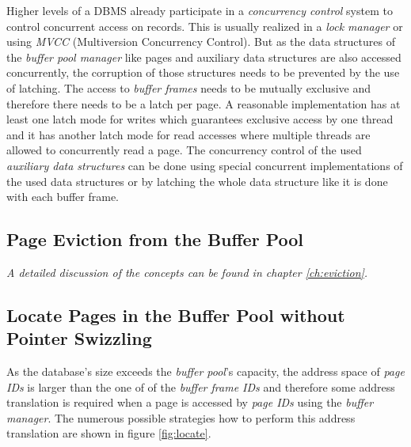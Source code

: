 	Higher levels of a DBMS already participate in a \emph{concurrency control} system to control concurrent access on records. This is usually realized in a \emph{lock manager} or using \emph{MVCC} (Multiversion Concurrency Control). But as the data structures of the \emph{buffer pool manager} like pages and auxiliary data structures are also accessed concurrently, the corruption of those structures needs to be prevented by the use of latching. The access to \emph{buffer frames} needs to be mutually exclusive and therefore there needs to be a latch per page. A reasonable implementation has at least one latch mode for writes which guarantees exclusive access by one thread and it has another latch mode for read accesses where multiple threads are allowed to concurrently read a page. The concurrency control of the used \emph{auxiliary data structures} can be done using special concurrent implementations of the used data structures or by latching the whole data structure like it is done with each buffer frame.

\subsection[Page Eviction]{Page Eviction from the Buffer Pool}

	\textit{A detailed discussion of the concepts can be found in chapter \ref{ch:eviction}.}

\subsection[Without Pointer Swizzling]{Locate Pages in the Buffer Pool without Pointer Swizzling} \label{subsec:locatenoswizzle}

	As the database's size exceeds the \emph{buffer pool}'s capacity, the address space of \emph{page IDs} is larger than the one of of the \emph{buffer frame IDs} and therefore some address translation is required when a page is accessed by \emph{page IDs} using the \emph{buffer manager}. The numerous possible strategies how to perform this address translation are shown in figure \ref{fig:locate}.

